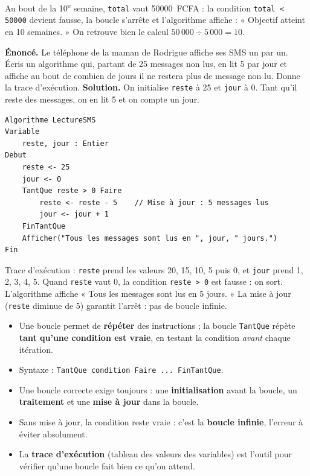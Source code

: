 \documentclass[11pt]{article}
\begin{document}
Au bout de la 10\textsuperscript{e} semaine, \texttt{total} vaut \SI{50000}{FCFA} : la condition \texttt{total < 50000} devient fausse, la boucle s'arrête et l'algorithme affiche : « Objectif atteint en 10 semaines. » On retrouve bien le calcul $50\,000 \div 5\,000 = 10$.

\begin{exoresolu}
\textbf{Énoncé.} Le téléphone de la maman de Rodrigue affiche ses SMS un par un. Écris un algorithme qui, partant de 25 messages non lus, en lit 5 par jour et affiche au bout de combien de jours il ne restera plus de message non lu. Donne la trace d'exécution.
\tcblower
\textbf{Solution.} On initialise \texttt{reste} à 25 et \texttt{jour} à 0. Tant qu'il reste des messages, on en lit 5 et on compte un jour.
\begin{lstlisting}
Algorithme LectureSMS
Variable
    reste, jour : Entier
Debut
    reste <- 25
    jour <- 0
    TantQue reste > 0 Faire
        reste <- reste - 5    // Mise à jour : 5 messages lus
        jour <- jour + 1
    FinTantQue
    Afficher("Tous les messages sont lus en ", jour, " jours.")
Fin
\end{lstlisting}
Trace d'exécution : \texttt{reste} prend les valeurs 20, 15, 10, 5 puis 0, et \texttt{jour} prend 1, 2, 3, 4, 5. Quand \texttt{reste} vaut 0, la condition \texttt{reste > 0} est fausse : on sort. L'algorithme affiche « Tous les messages sont lus en 5 jours. » La mise à jour (\texttt{reste} diminue de 5) garantit l'arrêt : pas de boucle infinie.
\end{exoresolu}

\begin{aretenir}
\begin{itemize}
  \item Une boucle permet de \textbf{répéter} des instructions ; la boucle \texttt{TantQue} répète \textbf{tant qu'une condition est vraie}, en testant la condition \emph{avant} chaque itération.
  \item Syntaxe : \texttt{TantQue condition Faire ... FinTantQue}.
  \item Une boucle correcte exige toujours : une \textbf{initialisation} avant la boucle, un \textbf{traitement} et une \textbf{mise à jour} dans la boucle.
  \item Sans mise à jour, la condition reste vraie : c'est la \textbf{boucle infinie}, l'erreur à éviter absolument.
  \item La \textbf{trace d'exécution} (tableau des valeurs des variables) est l'outil pour vérifier qu'une boucle fait bien ce qu'on attend.
\end{itemize}
\end{aretenir}
\end{document}
